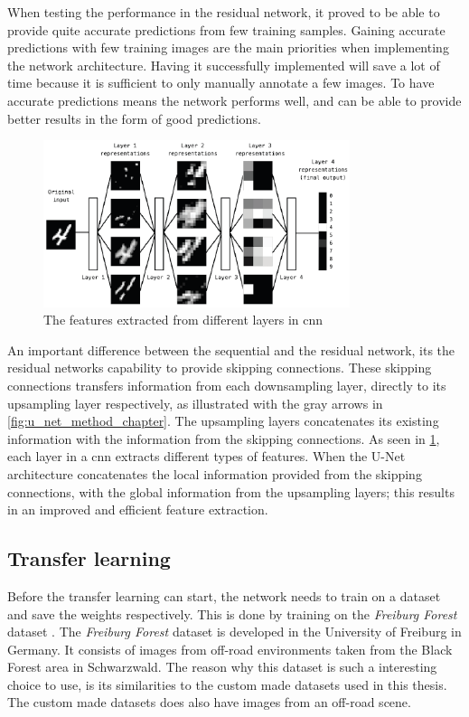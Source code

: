 \documentclass[USenglish]{ifimaster}  %
\begin{document}
When testing the performance in the residual network, it proved to be able to provide quite accurate predictions from few training samples. Gaining accurate predictions with few training images are the main priorities when implementing the network architecture. Having it successfully implemented will save a lot of time because it is sufficient to only manually annotate a few images. To have accurate predictions means the network performs well, and can be able to provide better results in the form of good predictions. 

\begin{figure}[ht]
    \centering
    \includegraphics[width=0.8\textwidth]{bilder/layers_features.png}
    \caption{The features extracted from different layers in \ac{cnn} \cite{Francois_Deep_learning_with_python}}
    \label{fig:layers_features}
\end{figure}

An important difference between the sequential and the residual network, its the residual networks capability to provide skipping connections. These skipping connections transfers information from each downsampling layer, directly to its upsampling layer respectively, as illustrated with the gray arrows in \cref{fig:u_net_method_chapter}. The upsampling layers concatenates its existing information with the information from the skipping connections. As seen in \cref{fig:layers_features}, each layer in a \ac{cnn} extracts different types of features. When the U-Net architecture concatenates the local information provided from the skipping connections, with the global information from the upsampling layers; this results in an improved and efficient feature extraction.  

\subsection{Transfer learning}
Before the transfer learning can start, the network needs to train on a dataset and save the weights respectively. This is done by training on the \textit{Freiburg Forest} dataset \cite{freiburg_dataset_valada16iser}. The \textit{Freiburg Forest} dataset is developed in the University of Freiburg in Germany. It consists of images from off-road environments taken from the Black Forest area in Schwarzwald. The reason why this dataset is such a interesting choice to use, is its similarities to the custom made datasets used in this thesis. The custom made datasets does also have images from an off-road scene.
\end{document}
